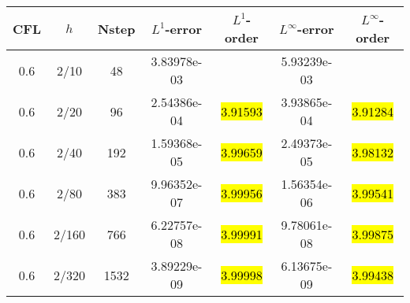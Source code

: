 \def\titleintable{CFL&$h$&Nstep&$L^1$-error&$L^1$-order&$L^\infty$-error&$L^\infty$-order\\}

\begin{table}[htbp]
  \label{ta:2D-ex2-WHC4}
  \centering
  \begin{tabular}{ccccccc}
    \toprule
    \titleintable
    \midrule
    0.6 & 2/10  & 48   & 3.83978e-03 &              & 5.93239e-03 &              \\
    0.6 & 2/20  & 96   & 2.54386e-04 & \hl{3.91593} & 3.93865e-04 & \hl{3.91284} \\
    0.6 & 2/40  & 192  & 1.59368e-05 & \hl{3.99659} & 2.49373e-05 & \hl{3.98132} \\
    0.6 & 2/80  & 383  & 9.96352e-07 & \hl{3.99956} & 1.56354e-06 & \hl{3.99541} \\
    0.6 & 2/160 & 766  & 6.22757e-08 & \hl{3.99991} & 9.78061e-08 & \hl{3.99875} \\
    0.6 & 2/320 & 1532 & 3.89229e-09 & \hl{3.99998} & 6.13675e-09 & \hl{3.99438} \\
    \bottomrule
  \end{tabular}
\end{table}

